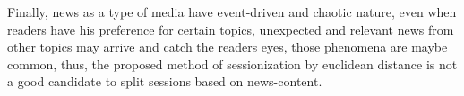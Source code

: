 \documentclass[ecp,tc,english]{iiufrgs}
\begin{document}
Finally, news as a type of media have event-driven and chaotic nature, even when readers have his preference for certain topics, unexpected and relevant news from other topics may arrive and catch the readers eyes, those phenomena are maybe common, thus, the proposed method of sessionization by euclidean distance is not a good candidate to split sessions based on news-content.




\end{document}
